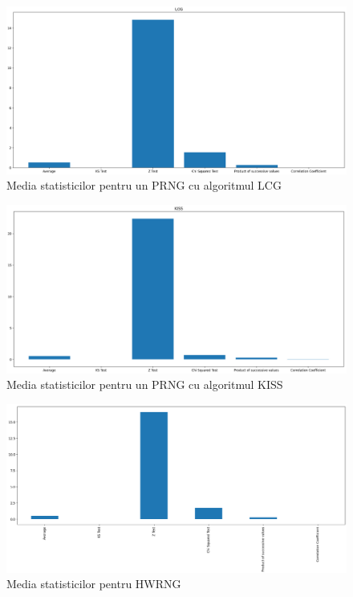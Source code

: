 \begin{figure}[H]
    \centering
    \includegraphics[width=1.0\textwidth]{continut/capitol4/figuri/StatsLCG.png}
    \caption{Media statisticilor pentru un PRNG cu algoritmul LCG}
    \label{fig:StatsBarLCG}
\end{figure}

\begin{figure}[H]
    \centering
    \includegraphics[width=1.0\textwidth]{continut/capitol4/figuri/StatsKISS.png}
    \caption{Media statisticilor pentru un PRNG cu algoritmul KISS}
    \label{fig:StatsBarKISS}
\end{figure}

\begin{figure}[H]
    \centering
    \includegraphics[width=1.0\textwidth]{continut/capitol4/figuri/StatsHWRNG.png}
    \caption{Media statisticilor pentru HWRNG}
    \label{fig:StatsBarHWRNG}
\end{figure}

